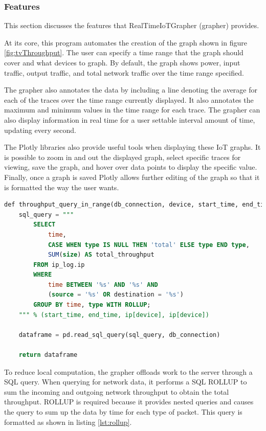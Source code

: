 \subsubsection{Features}
\label{Features}

This section discusses the features that RealTimeIoTGrapher (grapher) provides.

At its core, this program automates the creation of the graph shown in figure \ref{fig:tvThroughput}. The user can specify a time range that the graph should cover and what devices to graph. By default, the graph shows power, input traffic, output traffic, and total network traffic over the time range specified.

The grapher also annotates the data by including a line denoting the average for each of the traces over the time range currently displayed. It also annotates the maximum and minimum values in the time range for each trace. The grapher can also display information in real time for a user settable interval amount of time, updating every second.

The Plotly libraries also provide useful tools when displaying these IoT graphs. It is possible to zoom in and out the displayed graph, select specific traces for viewing, save the graph, and hover over data points to display the specific value. Finally, once a graph is saved Plotly allows further editing of the graph so that it is formatted the way the user wants.

\noindent
\begin{minipage}{\textwidth}
    \begin{lstlisting}[language=SQL, label={lst:rollup},caption={Efficient SQL query to obtain total Network throughput at each second.}]
    def throughput_query_in_range(db_connection, device, start_time, end_time):
    sql_query = """
        SELECT
            time,
            CASE WHEN type IS NULL THEN 'total' ELSE type END type,
            SUM(size) AS total_throughput
        FROM ip_log.ip
        WHERE
            time BETWEEN '%s' AND '%s' AND
            (source = '%s' OR destination = '%s')
        GROUP BY time, type WITH ROLLUP;
    """ % (start_time, end_time, ip[device], ip[device])

    dataframe = pd.read_sql_query(sql_query, db_connection)

    return dataframe
    \end{lstlisting}
\end{minipage}

To reduce local computation, the grapher offloads work to the server through a SQL query. When querying for network data, it performs a SQL ROLLUP to sum the incoming and outgoing network throughput to obtain the total throughput. ROLLUP is required because it provides nested queries and causes the query to sum up the data by time for each type of packet. This query is formatted as shown in listing \ref{lst:rollup}.


